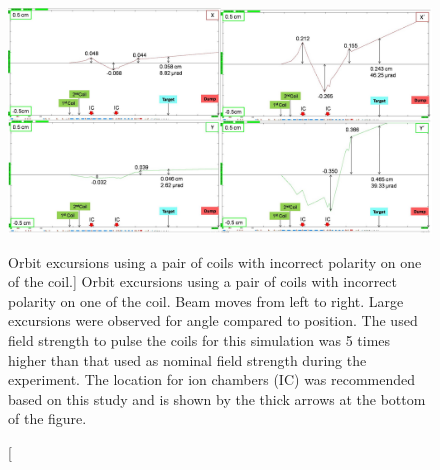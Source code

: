 \begin{singlespace}
\begin{figure}[!h]
	\begin{center}
	\includegraphics[width=15.0cm]{figures/BModMachineProtectionAllPair}
	\end{center}
	\caption
	[Orbit excursions using a pair of coils with incorrect polarity on one of the coil.]
	{Orbit excursions using a pair of coils with incorrect polarity on one of the coil. Beam moves from left to right. Large excursions were observed for angle compared to position. The used field strength to pulse the coils for this simulation was 5 times higher than that used as nominal field strength during the experiment. The location for ion chambers (IC) was recommended based on this study and is shown by the thick arrows at the bottom of the figure.}
	\label{fig:BModMachineProtectionAllPair}
\end{figure}
\end{singlespace}



